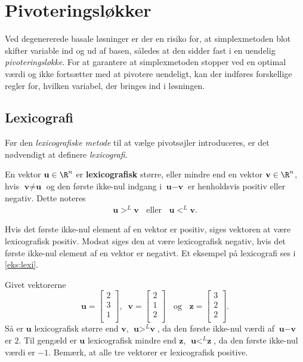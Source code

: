 \section{Pivoteringsløkker}
Ved degenererede basale løsninger er der en risiko for, at simplexmetoden blot skifter variable ind og ud af basen, således at den sidder fast i en uendelig \textit{pivoteringsløkke}.  
For at garantere at simplexmetoden stopper ved en optimal værdi og ikke fortsætter med at pivotere uendeligt, kan der indføres forskellige regler for, hvilken variabel, der bringes ind i løsningen.

\subsection{Lexicografi}
%
Før den \textit{lexicografiske metode} til at vælge pivotsøjler introduceres, er det nødvendigt at definere \textit{lexicografi}.
\begin{defn}{}{}
En vektor $\textbf{u}\in \R^n$ er \textbf{lexicografisk} større, eller mindre end en vektor $\textbf{v}\in \R^n$, hvis $\textbf{v} \neq \textbf{u}$ og den første ikke-nul indgang i $\textbf{u}-\textbf{v}$ er henholdsvis positiv eller negativ. Dette noteres
\begin{align*}
\textbf{u} >^L \textbf{v} \phantom{..} \text{ eller }\phantom{..} \textbf{u} <^L \textbf{v}.
\end{align*} 
\end{defn}
\noindent
Hvis det første ikke-nul element af en vektor er positiv, siges vektoren at være lexicografisk positiv. Modsat siges den at være lexicografisk negativ, hvis det første ikke-nul element af en vektor er negativt. Et eksempel på lexicografi ses i \ref{eks:lexi}.
\\
%
\begin{eks}\label{eks:lexi}
Givet vektorerne
$$\textbf{u}=
\begin{bmatrix}
2\\
3\\
1\\
\end{bmatrix}
,\phantom{..}
\textbf{v}=
\begin{bmatrix}
2\\
1\\
2\\
\end{bmatrix}
\phantom{..}\text{ og }\phantom{..}
\textbf{z}=
\begin{bmatrix}
3\\
2\\
2\\
\end{bmatrix}
.$$
Så er $\textbf{u}$  lexicografisk større end $\textbf{v}$, $\textbf{u} >^L \textbf{v}$, da den første ikke-nul værdi af $\textbf{u}-\textbf{v}$ er $2$.
Til gengæld er $\textbf{u}$ lexicografisk mindre end $\textbf{z}$, $\textbf{u} <^L \textbf{z}$, da den første ikke-nul værdi er $-1$.
Bemærk, at alle tre vektorer er lexicografisk positive.
\end{eks}
